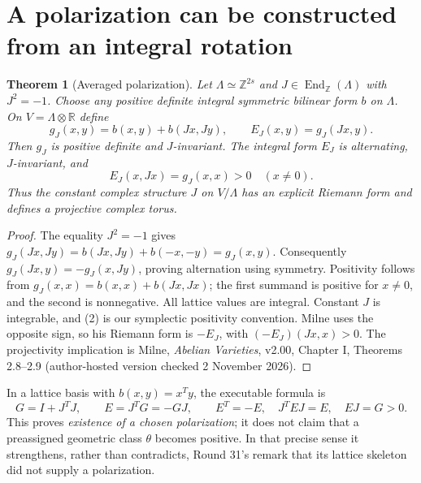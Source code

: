 \documentclass[11pt]{article}
\newtheorem{theorem}{Theorem}
\newcommand{\Z}{\mathbb Z}
\newcommand{\R}{\mathbb R}
\begin{document}
\section{A polarization can be constructed from an integral rotation}
\begin{theorem}[Averaged polarization]
Let $\Lambda\simeq\Z^{2s}$ and $J\in\operatorname{End}_{\Z}(\Lambda)$
with $J^2=-1$. Choose any positive definite integral symmetric bilinear
form $b$ on $\Lambda$. On $V=\Lambda\otimes\R$ define
\[
 g_J(x,y)=b(x,y)+b(Jx,Jy),\qquad
 E_J(x,y)=g_J(Jx,y).
 \tag{1}
\]
Then $g_J$ is positive definite and $J$-invariant. The integral form
$E_J$ is alternating, $J$-invariant, and
\[
 E_J(x,Jx)=g_J(x,x)>0\quad(x\ne0).                 \tag{2}
\]
Thus the constant complex structure $J$ on $V/\Lambda$ has an explicit
Riemann form and defines a projective complex torus.
\end{theorem}
\begin{proof}
The equality $J^2=-1$ gives
$g_J(Jx,Jy)=b(Jx,Jy)+b(-x,-y)=g_J(x,y)$.
Consequently $g_J(Jx,y)=-g_J(x,Jy)$, proving alternation using symmetry.
Positivity follows from $g_J(x,x)=b(x,x)+b(Jx,Jx)$; the first summand
is positive for $x\ne0$, and the second is nonnegative.
All lattice values are integral. Constant $J$ is integrable, and (2)
is our symplectic positivity convention. Milne uses the opposite sign,
so his Riemann form is $-E_J$, with $(-E_J)(Jx,x)>0$.
The projectivity implication is Milne, \emph{Abelian Varieties}, v2.00,
Chapter I, Theorems 2.8--2.9 (author-hosted version checked 2 November 2026).
\end{proof}

In a lattice basis with $b(x,y)=x^Ty$, the executable formula is
\[
 G=I+J^TJ,\qquad E=J^TG=-GJ,\qquad
 E^T=-E,\quad J^TEJ=E,\quad EJ=G>0.              \tag{3}
\]
This proves \emph{existence of a chosen polarization}; it does not claim
that a preassigned geometric class $\theta$ becomes positive. In that
precise sense it strengthens, rather than contradicts, Round 31's
remark that its lattice skeleton did not supply a polarization.
\end{document}
